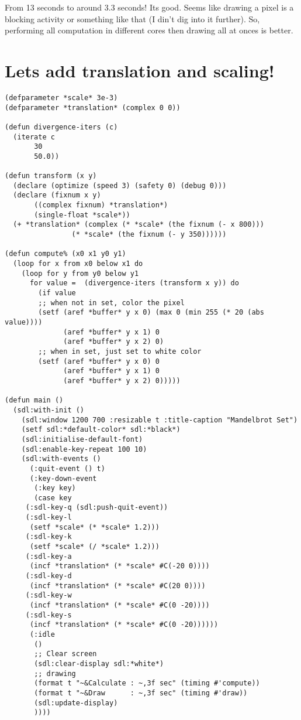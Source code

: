 \documentclass[11pt,a4paper]{article}
\begin{document}
From 13 seconds to around 3.3 seconds! Its good. Seems like drawing a pixel is a blocking activity or something like that (I din't dig into it further). So, performing all computation in different cores then drawing all at onces is better. 

\section{Lets add translation and scaling!}
\label{sec:org85949e6}
\begin{lstlisting}
(defparameter *scale* 3e-3)
(defparameter *translation* (complex 0 0))

(defun divergence-iters (c)
  (iterate c
	   30
	   50.0))

(defun transform (x y)
  (declare (optimize (speed 3) (safety 0) (debug 0)))
  (declare (fixnum x y)
	   ((complex fixnum) *translation*)
	   (single-float *scale*))
  (+ *translation* (complex (* *scale* (the fixnum (- x 800)))
			    (* *scale* (the fixnum (- y 350))))))

(defun compute% (x0 x1 y0 y1) 
  (loop for x from x0 below x1 do
    (loop for y from y0 below y1 
	  for value =  (divergence-iters (transform x y)) do
	    (if value 
		;; when not in set, color the pixel
		(setf (aref *buffer* y x 0) (max 0 (min 255 (* 20 (abs value))))
		      (aref *buffer* y x 1) 0
		      (aref *buffer* y x 2) 0)
		;; when in set, just set to white color
		(setf (aref *buffer* y x 0) 0
		      (aref *buffer* y x 1) 0
		      (aref *buffer* y x 2) 0)))))

(defun main ()
  (sdl:with-init ()
    (sdl:window 1200 700 :resizable t :title-caption "Mandelbrot Set")
    (setf sdl:*default-color* sdl:*black*)
    (sdl:initialise-default-font)
    (sdl:enable-key-repeat 100 10)
    (sdl:with-events ()
      (:quit-event () t)
      (:key-down-event
       (:key key)
       (case key
	 (:sdl-key-q (sdl:push-quit-event))
	 (:sdl-key-l
	  (setf *scale* (* *scale* 1.2)))
	 (:sdl-key-k
	  (setf *scale* (/ *scale* 1.2)))
	 (:sdl-key-a
	  (incf *translation* (* *scale* #C(-20 0))))
	 (:sdl-key-d
	  (incf *translation* (* *scale* #C(20 0))))
	 (:sdl-key-w
	  (incf *translation* (* *scale* #C(0 -20))))
	 (:sdl-key-s
	  (incf *translation* (* *scale* #C(0 -20))))))
      (:idle
       ()
       ;; Clear screen
       (sdl:clear-display sdl:*white*)
       ;; drawing
       (format t "~&Calculate : ~,3f sec" (timing #'compute))
       (format t "~&Draw      : ~,3f sec" (timing #'draw))
       (sdl:update-display)
       ))))
\end{lstlisting}
\end{document}
